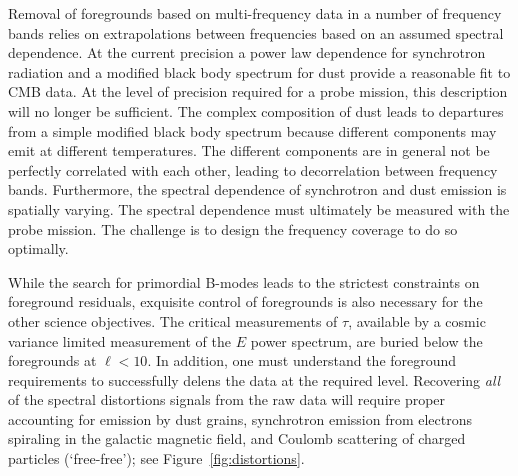 
Removal of foregrounds based on multi-frequency data in a number of frequency bands relies on extrapolations between frequencies based on an assumed spectral dependence. At the current precision a power law dependence for synchrotron radiation and a modified black body spectrum for dust provide a reasonable fit to CMB data. At the level of precision required for a probe mission, this description will no longer be sufficient. The complex composition of dust leads to departures from a simple modified black body spectrum because different components may emit at different temperatures. The different components are in general not be perfectly correlated with each other, leading to decorrelation between frequency bands. Furthermore, the spectral dependence of synchrotron and dust emission is spatially varying. The spectral dependence must ultimately be measured with the probe mission. The challenge is to design the frequency coverage to do so optimally.  

While the search for primordial B-modes leads to the strictest constraints on foreground residuals, exquisite control of foregrounds is also necessary for the other science objectives. The critical measurements of $\tau$, available by a cosmic variance limited measurement of the $E$ power spectrum, are buried below the foregrounds at $\ell < 10$. In addition, one must understand the foreground requirements to successfully delens the data at the required level.
Recovering {\it all} of the spectral distortions signals from the raw data will require proper accounting 
for emission by dust grains, synchrotron emission from electrons spiraling in the galactic magnetic 
field, and Coulomb scattering of charged particles (`free-free'); see Figure~\ref{fig:distortions}.   




